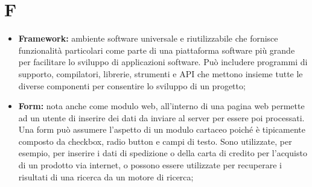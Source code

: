 %


\section*{\Huge F} %
\label{sec:f}
	\begin{itemize}
		\item \textbf{Framework:} ambiente software universale e riutilizzabile che fornisce funzionalità particolari come parte di una piattaforma software più grande per facilitare lo sviluppo di applicazioni software. Può includere programmi di supporto, compilatori, librerie, strumenti e API che mettono insieme tutte le diverse componenti per consentire lo sviluppo di un progetto;
		\item \textbf{Form:} nota anche come modulo web, all'interno di una pagina web permette ad un utente di inserire dei dati da inviare al server per essere poi processati. Una form può assumere l'aspetto di un modulo cartaceo poiché è tipicamente composto da checkbox, radio button e campi di testo. Sono utilizzate, per esempio, per inserire i dati di spedizione o della carta di credito per l'acquisto di un prodotto via internet, o possono essere utilizzate per recuperare i risultati di una ricerca da un motore di ricerca;
	\end{itemize}
\pagebreak

